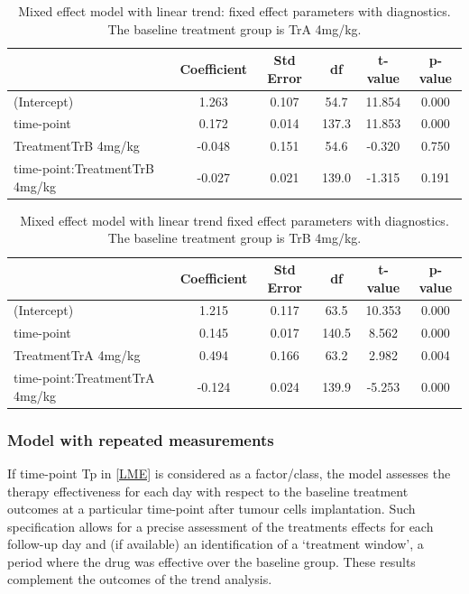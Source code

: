 \begin{table}
	\centering
	\small
	\begin{tabular}{lccccc}
		\hline
		                              & Coefficient & Std Error & df    & t-value & p-value \\
		\hline
		(Intercept)                   & 1.263       & 0.107     & 54.7  & 11.854  & 0.000   \\
		time-point                     & 0.172       & 0.014     & 137.3 & 11.853  & 0.000   \\
		TreatmentTrB 4mg/kg           & -0.048      & 0.151     & 54.6  & -0.320  & 0.750   \\
		time-point:TreatmentTrB 4mg/kg & -0.027      & 0.021     & 139.0 & -1.315  & 0.191   \\
		\hline
	\end{tabular}
	\caption{Mixed effect model with linear trend: fixed effect parameters with diagnostics.
	The baseline treatment group is TrA 4mg/kg.}
	\label{LME_trend_TrB_basline_Saline}
\end{table}


\begin{table}
	\centering
	\small
	\begin{tabular}{lccccc}
		\hline
		                              & Coefficient & Std Error & df    & t-value & p-value \\
		\hline
		(Intercept)                   & 1.215       & 0.117     & 63.5  & 10.353  & 0.000   \\
		time-point                     & 0.145       & 0.017     & 140.5 & 8.562   & 0.000   \\
		TreatmentTrA 4mg/kg           & 0.494       & 0.166     & 63.2  & 2.982   & 0.004   \\
		time-point:TreatmentTrA 4mg/kg & -0.124      & 0.024     & 139.9 & -5.253  & 0.000   \\
		\hline
	\end{tabular}
	\caption{Mixed effect model with linear trend fixed effect parameters with diagnostics.
	The baseline treatment group is TrB 4mg/kg.}
	\label{LME_trend_TrA_baseline_TrB}
\end{table}

\subsubsection{Model with repeated measurements}
If time-point Tp in \cref{LME} is considered as a factor/class, the model assesses the therapy effectiveness for each day with respect to the baseline treatment outcomes at a particular time-point after tumour cells implantation.
Such specification allows for a precise assessment of the treatments effects for each follow-up day and (if available) an identification of a `treatment window', a period where the drug was effective over the baseline group.
These results complement the outcomes of the trend analysis.

